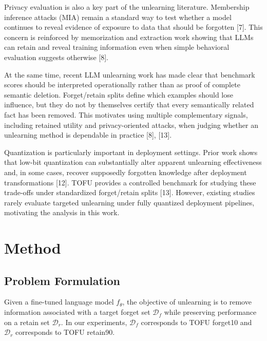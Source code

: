 \documentclass[conference]{IEEEtran}
\begin{document}
Privacy evaluation is also a key part of the unlearning literature. Membership inference attacks (MIA) remain a standard way to test whether a model continues to reveal evidence of exposure to data that should be forgotten [7]. This concern is reinforced by memorization and extraction work showing that LLMs can retain and reveal training information even when simple behavioral evaluation suggests otherwise [8].

At the same time, recent LLM unlearning work has made clear that benchmark scores should be interpreted operationally rather than as proof of complete semantic deletion. Forget/retain splits define which examples should lose influence, but they do not by themselves certify that every semantically related fact has been removed. This motivates using multiple complementary signals, including retained utility and privacy-oriented attacks, when judging whether an unlearning method is dependable in practice [8], [13].

Quantization is particularly important in deployment settings. Prior work shows that low-bit quantization can substantially alter apparent unlearning effectiveness and, in some cases, recover supposedly forgotten knowledge after deployment transformations [12]. TOFU provides a controlled benchmark for studying these trade-offs under standardized forget/retain splits [13]. However, existing studies rarely evaluate targeted unlearning under fully quantized deployment pipelines, motivating the analysis in this work.

\section{Method}
\subsection{Problem Formulation}
Given a fine-tuned language model $f_{\theta}$, the objective of unlearning is to remove information associated with a target forget set $\mathcal{D}_f$ while preserving performance on a retain set $\mathcal{D}_r$. In our experiments, $\mathcal{D}_f$ corresponds to TOFU forget10 and $\mathcal{D}_r$ corresponds to TOFU retain90.
\end{document}
